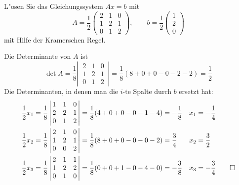 L"osen Sie das Gleichungssystem $Ax=b$ mit
\[
A=\frac12\begin{pmatrix}2&1&0\\1&2&1\\0&1&2\end{pmatrix},\qquad
b=\frac12\begin{pmatrix}1\\2\\0\end{pmatrix}
\]
mit Hilfe der Kramerschen Regel.

\begin{loesung}
Die Determinante von $A$ ist
\[
\operatorname{det}A
=
\frac18
\left|\,\begin{matrix}2&1&0\\1&2&1\\0&1&2\end{matrix}\,\right|
=\frac18(8+0+0-0-2-2)=\frac12
\]
Die Determinanten, in denen man die $i$-te Spalte durch $b$ ersetzt hat:
\begin{align*}
\frac12 x_1&=
\frac18\left|\,\begin{matrix}
1&1&0\\
2&2&1\\
0&1&2\end{matrix}\,\right|
=\frac18(4+0+0-0-1-4)=-\frac18
&x_1&=-\frac14
\\
\frac12 x_2&=
\frac18\left|\,\begin{matrix}
2&1&0\\
1&2&1\\
0&0&2\end{matrix}\,\right|
=\frac18(8+0+0-0-0-2)=\frac34
&x_2&=\frac32
\\
\frac12 x_3&=
\frac18\left|\,\begin{matrix}
2&1&1\\
1&2&2\\
0&1&0\end{matrix}\,\right|
=\frac18(0+0+1-0-4-0)=-\frac38
&x_3&=-\frac34
\qedhere
\end{align*}
\end{loesung}


